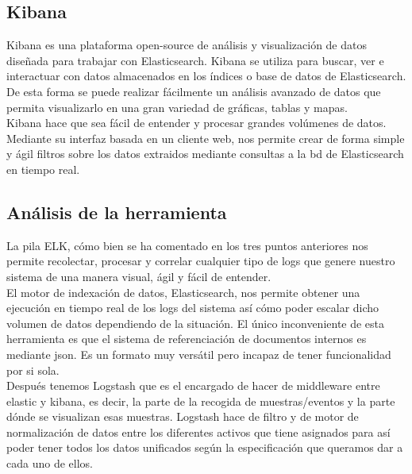 \subsection{Kibana}
Kibana es una plataforma open-source de análisis y visualización de datos diseñada para trabajar con Elasticsearch. Kibana se utiliza para buscar, ver e interactuar con datos almacenados en los índices o base de datos de Elasticsearch. De esta forma se puede realizar fácilmente un análisis avanzado de datos que permita visualizarlo en una gran variedad de gráficas, tablas y mapas.\\

Kibana hace que sea fácil de entender y procesar grandes volúmenes de datos. Mediante su interfaz basada en un cliente web, nos permite crear de forma simple y ágil filtros sobre los datos extraidos mediante consultas a la bd de Elasticsearch en tiempo real.\\


\subsection{Análisis de la herramienta}

La pila ELK, cómo bien se ha comentado en los tres puntos anteriores nos permite recolectar, procesar y correlar cualquier tipo de logs que genere nuestro sistema de una manera visual, ágil y fácil de entender. \\

El motor de indexación de datos, Elasticsearch, nos permite obtener una ejecución en tiempo real de los logs del sistema así cómo poder escalar dicho volumen de datos dependiendo de la situación. El único inconveniente de esta herramienta es que el sistema de referenciación de documentos internos es mediante json. Es un formato muy versátil pero incapaz de tener funcionalidad por si sola.\\

Después tenemos Logstash que es el encargado de hacer de middleware entre elastic y kibana, es decir, la parte de la recogida de muestras/eventos y la parte dónde se visualizan esas muestras. Logstash hace de filtro y de motor de normalización de datos entre los diferentes activos que tiene asignados para así poder tener todos los datos unificados según la especificación que queramos dar a cada uno de ellos. \\

